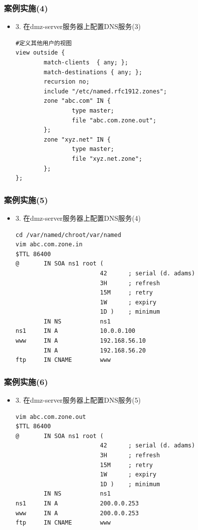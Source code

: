 \documentclass[xcolor=svgnames,presentation]{beamer}
\begin{document}
\begin{frame}[fragile]
\frametitle{案例实施(4)}
\label{sec-5-6}
\begin{itemize}

\item 3. 在dmz-server服务器上配置DNS服务(3)\\
\label{sec-5-6-1}%
\begin{verbatim}
#定义其他用户的视图
view outside {
        match-clients  { any; };
        match-destinations { any; };
        recursion no;
        include "/etc/named.rfc1912.zones";
        zone "abc.com" IN {
                type master;
                file "abc.com.zone.out";
        };
        zone "xyz.net" IN {
                type master;
                file "xyz.net.zone";
        };
};
\end{verbatim}
\end{itemize} %
\end{frame}
\begin{frame}[fragile]
\frametitle{案例实施(5)}
\label{sec-5-7}
\begin{itemize}

\item 3. 在dmz-server服务器上配置DNS服务(4)\\
\label{sec-5-7-1}%
\begin{verbatim}
cd /var/named/chroot/var/named
vim abc.com.zone.in
$TTL 86400
@       IN SOA ns1 root (
                        42      ; serial (d. adams)
                        3H      ; refresh
                        15M     ; retry
                        1W      ; expiry
                        1D )    ; minimum
        IN NS           ns1
ns1     IN A            10.0.0.100
www     IN A            192.168.56.10
        IN A            192.168.56.20
ftp     IN CNAME        www
\end{verbatim}
\end{itemize} %
\end{frame}
\begin{frame}[fragile]
\frametitle{案例实施(6)}
\label{sec-5-8}
\begin{itemize}

\item 3. 在dmz-server服务器上配置DNS服务(5)\\
\label{sec-5-8-1}%
\begin{verbatim}
vim abc.com.zone.out
$TTL 86400
@       IN SOA ns1 root (
                        42      ; serial (d. adams)
                        3H      ; refresh
                        15M     ; retry
                        1W      ; expiry
                        1D )    ; minimum
        IN NS           ns1
ns1     IN A            200.0.0.253
www     IN A            200.0.0.253
ftp     IN CNAME        www
\end{verbatim}
\end{itemize} %
\end{frame}
\end{document}
